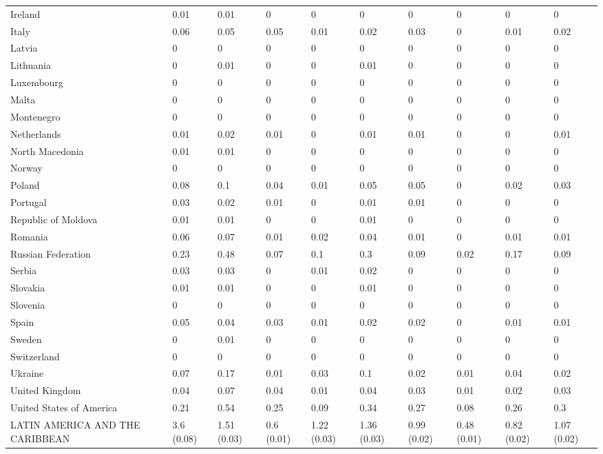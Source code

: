 \begin{longtable}[t]{llllllllll}
Ireland & 0.01 & 0.01 & 0 & 0 & 0 & 0 & 0 & 0 & 0\\
Italy & 0.06 & 0.05 & 0.05 & 0.01 & 0.02 & 0.03 & 0 & 0.01 & 0.02\\
Latvia & 0 & 0 & 0 & 0 & 0 & 0 & 0 & 0 & 0\\
Lithuania & 0 & 0.01 & 0 & 0 & 0.01 & 0 & 0 & 0 & 0\\
Luxembourg & 0 & 0 & 0 & 0 & 0 & 0 & 0 & 0 & 0\\
Malta & 0 & 0 & 0 & 0 & 0 & 0 & 0 & 0 & 0\\
Montenegro & 0 & 0 & 0 & 0 & 0 & 0 & 0 & 0 & 0\\
Netherlands & 0.01 & 0.02 & 0.01 & 0 & 0.01 & 0.01 & 0 & 0 & 0.01\\
North Macedonia & 0.01 & 0.01 & 0 & 0 & 0 & 0 & 0 & 0 & 0\\
Norway & 0 & 0 & 0 & 0 & 0 & 0 & 0 & 0 & 0\\
Poland & 0.08 & 0.1 & 0.04 & 0.01 & 0.05 & 0.05 & 0 & 0.02 & 0.03\\
Portugal & 0.03 & 0.02 & 0.01 & 0 & 0.01 & 0.01 & 0 & 0 & 0\\
Republic of Moldova & 0.01 & 0.01 & 0 & 0 & 0.01 & 0 & 0 & 0 & 0\\
Romania & 0.06 & 0.07 & 0.01 & 0.02 & 0.04 & 0.01 & 0 & 0.01 & 0.01\\
Russian Federation & 0.23 & 0.48 & 0.07 & 0.1 & 0.3 & 0.09 & 0.02 & 0.17 & 0.09\\
Serbia & 0.03 & 0.03 & 0 & 0.01 & 0.02 & 0 & 0 & 0 & 0\\
Slovakia & 0.01 & 0.01 & 0 & 0 & 0.01 & 0 & 0 & 0 & 0\\
Slovenia & 0 & 0 & 0 & 0 & 0 & 0 & 0 & 0 & 0\\
Spain & 0.05 & 0.04 & 0.03 & 0.01 & 0.02 & 0.02 & 0 & 0.01 & 0.01\\
Sweden & 0 & 0.01 & 0 & 0 & 0 & 0 & 0 & 0 & 0\\
Switzerland & 0 & 0 & 0 & 0 & 0 & 0 & 0 & 0 & 0\\
Ukraine & 0.07 & 0.17 & 0.01 & 0.03 & 0.1 & 0.02 & 0.01 & 0.04 & 0.02\\
United Kingdom & 0.04 & 0.07 & 0.04 & 0.01 & 0.04 & 0.03 & 0.01 & 0.02 & 0.03\\
United States of America & 0.21 & 0.54 & 0.25 & 0.09 & 0.34 & 0.27 & 0.08 & 0.26 & 0.3\\
LATIN AMERICA AND THE CARIBBEAN & 3.6 (0.08) & 1.51 (0.03) & 0.6 (0.01) & 1.22 (0.03) & 1.36 (0.03) & 0.99 (0.02) & 0.48 (0.01) & 0.82 (0.02) & 1.07 (0.02)\\

\end{longtable}
